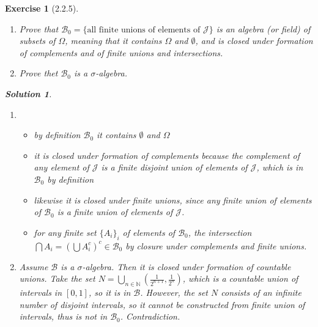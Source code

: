 \documentclass[]{scrartcl}
\theoremstyle{break}
\newtheorem*{exercise}{Exercise}
\theoremstyle{definition}
\theoremstyle{break}\theorembodyfont{\normalfont}\theoremheaderfont{\itshape}
\newtheorem*{solution}{Solution}
\begin{document}
\begin{exercise}[2.2.5]
  \begin{enumerate}
    \item Prove that $\mathcal{B}_0 = \{\text{all finite unions of elements of }
      \mathcal{J}\}$ is an \emph{algebra} (or \emph{field}) of subsets of
      $\Omega$, meaning that it contains $\Omega$ and $\emptyset$, and is closed
      under formation of complements and of \emph{finite} unions and
      intersections.
    \item Prove thet $\mathcal{B}_0$ is  a $\sigma$-algebra.
  \end{enumerate}

  \begin{solution}
    \begin{enumerate}
      \item
      \begin{itemize}
        \item by definition $\mathcal{B}_0$ it contains $\emptyset$ and $\Omega$
        \item it is closed under formation of complements because the complement
          of any element of $\mathcal{J}$ is a finite disjoint union of elements
          of $\mathcal{J}$, which is in $\mathcal{B}_0$ by definition
        \item likewise it is closed under finite unions, since any finite union
          of elements of $\mathcal{B}_0$ is a finite union of elements of
          $\mathcal{J}$.
        \item for any finite set $\{A_i\}_i$ of elements of $\mathcal{B}_0$,
          the intersection $\bigcap A_i= {(\bigcup A_i^c)}^c \in\mathcal{B}_0$ 
          by closure under complements and finite unions.
      \end{itemize}
    \item Assume $\mathcal{B}$ is a $\sigma$-algebra. Then it is closed under 
      formation of countable unions. Take the set
      $N=\bigcup_{n\in\mathbb{N}}(\frac{1}{2^{n+1}},\frac{1}{2^n})$, which
      is a countable union of intervals in $[0,1]$, so it is in $\mathcal{B}$.
      However, the set $N$ consists of an infinite number of disjoint intervals,
      so it cannot be constructed from finite union of intervals,
      thus is not in $\mathcal{B}_0$. Contradiction.
    \end{enumerate}
  \end{solution}
\end{exercise}


\printbibliography[title=References]{}
\end{document}

